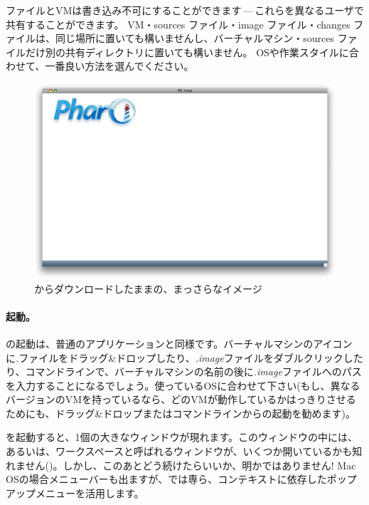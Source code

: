 \documentclass[a4paper,10pt,twoside]{book}
\begin{document}
ファイルとVMは書き込み不可にすることができます\,---\,これらを異なるユーザで共有することができます。
VM・sources ファイル・image ファイル・changes ファイルは、同じ場所に置いても構いませんし、バーチャルマシン・sources ファイルだけ別の共有ディレクトリに置いても構いません。
OSや作業スタイルに合わせて、一番良い方法を選んでください。

\begin{figure}[htb]
\centerline {\includegraphics[width=\textwidth]{startup}}
\caption{\pbe からダウンロードしたままの、まっさらなイメージ}
\end{figure}

\paragraph{起動。} \pharo の起動は、普通のアプリケーションと同様です。バーチャルマシンのアイコンに\emph{.}ファイルをドラッグ\&ドロップしたり、\emph{.image}ファイルをダブルクリックしたり、コマンドラインで、バーチャルマシンの名前の後に\emph{.image}ファイルへのパスを入力することになるでしょう。使っているOSに合わせて下さい(もし、異なるバージョンのVMを持っているなら、どのVMが動作しているかはっきりさせるためにも、ドラッグ\&ドロップまたはコマンドラインからの起動を勧めます)。

\pharo を起動すると、1個の大きなウィンドウが現れます。このウィンドウの中には、あるいは、ワークスペースと呼ばれるウィンドウが、いくつか開いているかも知れません()。しかし、このあとどう続けたらいいか、明かではありません!
Mac OSの場合メニューバーも出ますが、\pharo では専ら、コンテキストに依存したポップアップメニューを活用します。
\end{document}

